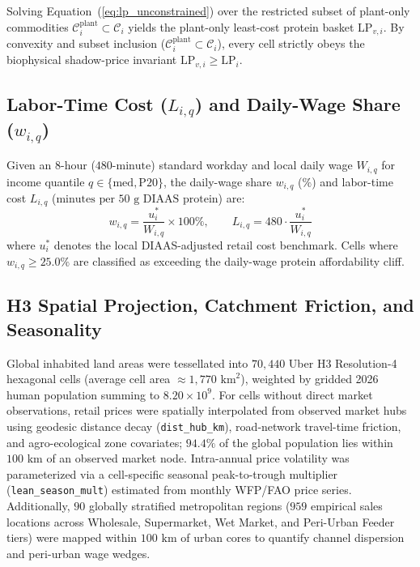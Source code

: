 \documentclass[11pt,a4paper]{article}
\begin{document}
Solving Equation~(\ref{eq:lp_unconstrained}) over the restricted subset of plant-only commodities $\mathcal{C}_i^{\text{plant}} \subset \mathcal{C}_i$ yields the plant-only least-cost protein basket $\text{LP}_{v,i}$. By convexity and subset inclusion ($\mathcal{C}_i^{\text{plant}} \subset \mathcal{C}_i$), every cell strictly obeys the biophysical shadow-price invariant $\text{LP}_{v,i} \ge \text{LP}_i$.

\subsection{Labor-Time Cost ($L_{i,q}$) and Daily-Wage Share ($w_{i,q}$)}
Given an $8\text{-hour}$ ($480\text{-minute}$) standard workday and local daily wage $W_{i,q}$ for income quantile $q \in \{\text{med}, \text{P20}\}$, the daily-wage share $w_{i,q}$ ($\%$) and labor-time cost $L_{i,q}$ ($\text{minutes per 50 g DIAAS protein}$) are:
\begin{equation}
w_{i,q} = \frac{u_i^*}{W_{i,q}} \times 100\%, \qquad L_{i,q} = 480 \cdot \frac{u_i^*}{W_{i,q}}
\label{eq:labor_min}
\end{equation}
where $u_i^*$ denotes the local DIAAS-adjusted retail cost benchmark. Cells where $w_{i,q} \ge 25.0\%$ are classified as exceeding the daily-wage protein affordability cliff.

\subsection{H3 Spatial Projection, Catchment Friction, and Seasonality}
Global inhabited land areas were tessellated into $70{,}440$ Uber H3 Resolution-4 hexagonal cells (average cell area $\approx 1{,}770\text{ km}^2$), weighted by gridded 2026 human population summing to $8.20 \times 10^9$. For cells without direct market observations, retail prices were spatially interpolated from observed market hubs using geodesic distance decay (\texttt{dist\_hub\_km}), road-network travel-time friction, and agro-ecological zone covariates; $94.4\%$ of the global population lies within $100\text{ km}$ of an observed market node. Intra-annual price volatility was parameterized via a cell-specific seasonal peak-to-trough multiplier (\texttt{lean\_season\_mult}) estimated from monthly WFP/FAO price series. Additionally, $90$ globally stratified metropolitan regions ($959$ empirical sales locations across Wholesale, Supermarket, Wet Market, and Peri-Urban Feeder tiers) were mapped within $100\text{ km}$ of urban cores to quantify channel dispersion and peri-urban wage wedges.
\end{document}
